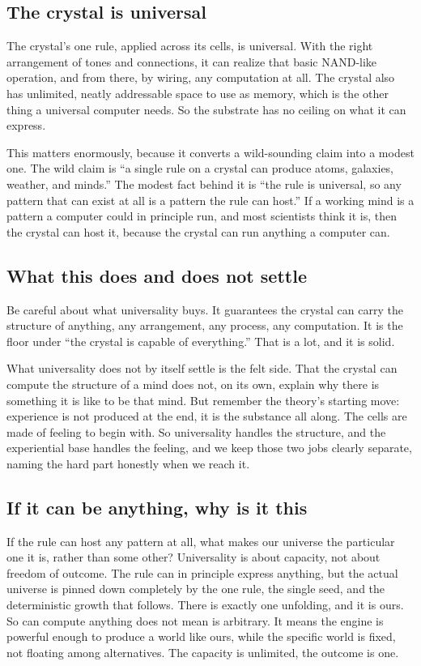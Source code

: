 \subsection{The crystal is universal}

The crystal's one rule, applied across its cells, is universal. With the right arrangement of tones and connections, it can realize that basic NAND-like operation, and from there, by wiring, any computation at all. The crystal also has unlimited, neatly addressable space to use as memory, which is the other thing a universal computer needs. So the substrate has no ceiling on what it can express.

This matters enormously, because it converts a wild-sounding claim into a modest one. The wild claim is ``a single rule on a crystal can produce atoms, galaxies, weather, and minds.'' The modest fact behind it is ``the rule is universal, so any pattern that can exist at all is a pattern the rule can host.'' If a working mind is a pattern a computer could in principle run, and most scientists think it is, then the crystal can host it, because the crystal can run anything a computer can.

\subsection{What this does and does not settle}

Be careful about what universality buys. It guarantees the crystal can carry the structure of anything, any arrangement, any process, any computation. It is the floor under ``the crystal is capable of everything.'' That is a lot, and it is solid.

What universality does not by itself settle is the felt side. That the crystal can compute the structure of a mind does not, on its own, explain why there is something it is like to be that mind. But remember the theory's starting move: experience is not produced at the end, it is the substance all along. The cells are made of feeling to begin with. So universality handles the structure, and the experiential base handles the feeling, and we keep those two jobs clearly separate, naming the hard part honestly when we reach it.

\subsection{If it can be anything, why is it this}

If the rule can host any pattern at all, what makes our universe the particular one it is, rather than some other? Universality is about capacity, not about freedom of outcome. The rule can in principle express anything, but the actual universe is pinned down completely by the one rule, the single seed, and the deterministic growth that follows. There is exactly one unfolding, and it is ours. So can compute anything does not mean is arbitrary. It means the engine is powerful enough to produce a world like ours, while the specific world is fixed, not floating among alternatives. The capacity is unlimited, the outcome is one.

